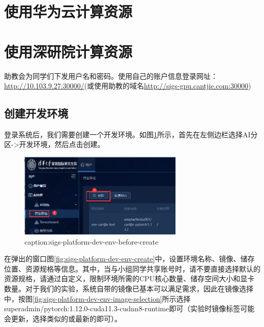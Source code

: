 \section{使用华为云计算资源}


\section{使用深研院计算资源}

助教会为同学们下发用户名和密码。使用自己的账户信息登录网址：\url{http://10.103.9.27:30000/}(或使用助教的域名\url{http://sigs-gpu.cantjie.com:30000})

\subsection{创建开发环境}

登录系统后，我们需要创建一个开发环境。如图\ref{fig:sigs-platform-dev-env-before-create}所示，首先在左侧边栏选择AI分区->开发环境，然后点击创建。

\begin{figure}[htbp]
	\centering
	\includegraphics[width=0.7\textwidth]{figures/sigs-platform-dev-env-before-create.png}
	\caption{caption:sigs-platform-dev-env-before-create}
	\label{fig:sigs-platform-dev-env-before-create}
\end{figure}

在弹出的窗口图\ref{fig:sigs-platform-dev-env-create}中，设置环境名称、镜像、储存位置、资源规格等信息。其中，当与小组同学共享账号时，请不要直接选择默认的资源规格，请通过自定义，限制环境所需的CPU核心数量、储存空间大小和显卡数量。对于我们的实验，系统自带的镜像已基本可以满足需求，因此在镜像选择中，按图\ref{fig:sigs-platform-dev-env-image-selection}所示选择superadmin/pytorch:1.12.0-cuda11.3-cudnn8-runtime即可（实验时镜像标签可能会更新，选择类似的或最新的即可）。

